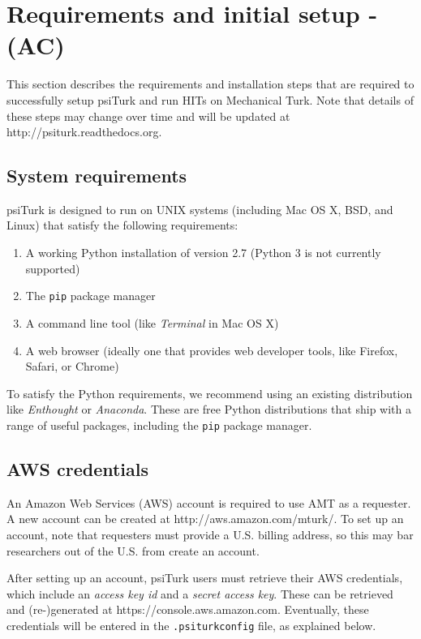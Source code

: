 \documentclass[twocolumn]{svjour3}          %
\newcommand{\psiturk}[0]{\textsf{psiTurk}}
\begin{document}
\section{Requirements and initial setup - (AC)}
This section describes the requirements and installation steps that are required to successfully setup \psiturk{} and run
HITs on Mechanical Turk. Note that details of these steps may change over time and will be updated at \textsf{http://psiturk.readthedocs.org}.

\subsection{System requirements}
\psiturk{} is designed to run on UNIX systems (including Mac OS X, BSD, and Linux) that satisfy the following requirements:

\begin{enumerate}
\item A working Python installation of version 2.7 (Python 3 is not currently supported)
\item The \texttt{pip} package manager 
\item A command line tool (like \emph{Terminal} in Mac OS X)
\item A web browser (ideally one that provides web developer tools, like Firefox, Safari, or Chrome)
\end{enumerate}

To satisfy the Python requirements, we recommend using an existing distribution like \emph{Enthought} or \emph{Anaconda}. These are free
Python distributions that ship with a range of useful packages, including the \texttt{pip} package manager. 

\subsection{AWS credentials}
An Amazon Web Services (AWS) account is required to use AMT as a requester. A new account can be created at \textsf{http://aws.amazon.com/mturk/}. 
To set up an account, note that requesters
must provide a U.S. billing address, so this may bar researchers out of the U.S. from create an account. 

After setting up an account, \psiturk{} users must retrieve their AWS credentials, which include an \emph{access key id} and a
\emph{secret access key}. These can be retrieved and (re-)generated at \textsf{https://console.aws.amazon.com}.
Eventually, these credentials will be entered in the \texttt{.psiturkconfig} file, as explained below.
\end{document}
